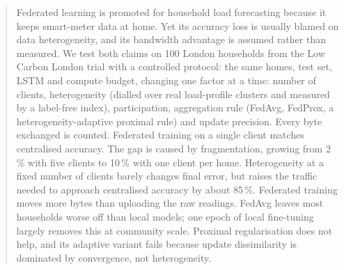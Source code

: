 \begin{abstract}
Federated learning is promoted for household load forecasting because it keeps smart-meter data at home. Yet its
accuracy loss is usually blamed on data heterogeneity, and its bandwidth advantage is assumed rather than measured.
We test both claims on 100 London households from the Low Carbon London trial with a controlled protocol: the same
homes, test set, LSTM and compute budget, changing one factor at a time: number of clients, heterogeneity (dialled
over real load-profile clusters and measured by a label-free index), participation, aggregation rule (FedAvg, FedProx,
a heterogeneity-adaptive proximal rule) and update precision.
Every byte exchanged is counted. Federated training on a single client matches centralised accuracy. The gap is
caused by fragmentation, growing from 2\,\% with five clients to 10\,\% with one client per home. Heterogeneity at
a fixed number of clients barely changes final error, but raises the traffic needed to approach centralised accuracy
by about 85\,\%. Federated training moves more bytes than uploading the raw readings. FedAvg leaves most households
worse off than local models; one epoch of local fine-tuning largely removes this at community scale. Proximal
regularisation does not help, and its adaptive variant fails because update dissimilarity is dominated by convergence,
not heterogeneity.
\end{abstract}
